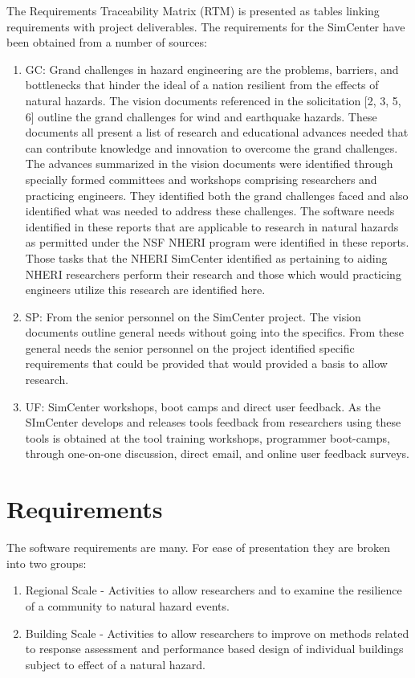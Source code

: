 \documentclass{simcenterdocumentation}
\begin{document}
The Requirements Traceability Matrix (RTM) is presented as tables linking requirements with project deliverables.  The requirements for the SimCenter have been obtained from a number of sources:
\begin{enumerate}
\item GC: Grand challenges in hazard engineering are the problems, barriers, and bottlenecks that hinder the ideal of a nation resilient from the effects of natural hazards. The vision documents referenced in the solicitation [2, 3, 5, 6] outline the grand challenges for wind and earthquake hazards. These documents all present a list of research and educational advances needed that can contribute knowledge and innovation to overcome the grand challenges. The advances summarized in the vision documents were identified through specially formed committees and workshops comprising researchers and practicing engineers. They identified both the grand challenges faced and also identified what was needed to address these challenges. The software needs identified in these reports that are applicable to research in natural hazards as permitted under the NSF NHERI program were identified in these reports. Those tasks that the NHERI SimCenter identified as pertaining to aiding NHERI researchers perform their research and those which would practicing engineers utilize this research are identified here.
\item SP: From the senior personnel on the SimCenter project. The vision documents outline general needs without going into the specifics. From these general needs the senior personnel on the project  identified specific requirements that could be provided that would provided a basis to allow research.
\item UF: SimCenter workshops, boot camps and direct user feedback. As the SImCenter develops and releases tools feedback from researchers using these tools is obtained at the tool training workshops, programmer boot-camps,  through one-on-one discussion, direct email, and online user feedback surveys. 
\end{enumerate}  




\chapter{Requirements}
\label{chap:requirements}

The software requirements are many. For ease of presentation they are broken into two groups:
\begin{enumerate}
\item Regional Scale - Activities to allow researchers and to examine the resilience of a community to natural hazard events.
\item Building Scale - Activities to allow researchers to improve on methods related to response assessment and performance based design of individual buildings subject to effect of a natural hazard.
\end{enumerate}
\end{document}
